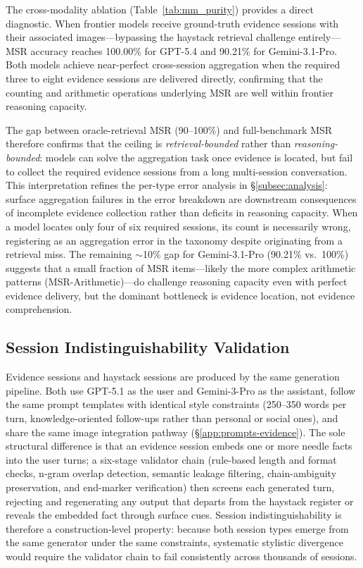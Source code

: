 \documentclass{article}
\begin{document}
The cross-modality ablation (Table~\ref{tab:mm_purity}) provides a direct diagnostic. When frontier models receive ground-truth evidence sessions with their associated images---bypassing the haystack retrieval challenge entirely---MSR accuracy reaches 100.00\% for GPT-5.4 and 90.21\% for Gemini-3.1-Pro. Both models achieve near-perfect cross-session aggregation when the required three to eight evidence sessions are delivered directly, confirming that the counting and arithmetic operations underlying MSR are well within frontier reasoning capacity.

The gap between oracle-retrieval MSR (90--100\%) and full-benchmark MSR therefore confirms that the ceiling is \emph{retrieval-bounded} rather than \emph{reasoning-bounded}: models can solve the aggregation task once evidence is located, but fail to collect the required evidence sessions from a long multi-session conversation. This interpretation refines the per-type error analysis in \S\ref{subsec:analysis}: surface aggregation failures in the error breakdown are downstream consequences of incomplete evidence collection rather than deficits in reasoning capacity. When a model locates only four of six required sessions, its count is necessarily wrong, registering as an aggregation error in the taxonomy despite originating from a retrieval miss. The remaining ${\sim}$10\% gap for Gemini-3.1-Pro (90.21\% vs.\ 100\%) suggests that a small fraction of MSR items---likely the more complex arithmetic patterns (MSR-Arithmetic)---do challenge reasoning capacity even with perfect evidence delivery, but the dominant bottleneck is evidence location, not evidence comprehension.


\subsection{Session Indistinguishability Validation}
\label{app:indistinguishability}

Evidence sessions and haystack sessions are produced by the same generation pipeline. Both use GPT-5.1 as the user and Gemini-3-Pro as the assistant, follow the same prompt templates with identical style constraints (250--350 words per turn, knowledge-oriented follow-ups rather than personal or social ones), and share the same image integration pathway (\S\ref{app:prompts-evidence}). The sole structural difference is that an evidence session embeds one or more needle facts into the user turns; a six-stage validator chain (rule-based length and format checks, n-gram overlap detection, semantic leakage filtering, chain-ambiguity preservation, and end-marker verification) then screens each generated turn, rejecting and regenerating any output that departs from the haystack register or reveals the embedded fact through surface cues. Session indistinguishability is therefore a construction-level property: because both session types emerge from the same generator under the same constraints, systematic stylistic divergence would require the validator chain to fail consistently across thousands of sessions.
\end{document}
